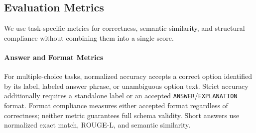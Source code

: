 \documentclass[a4paper,fleqn]{cas-sc}
\begin{document}



\subsection{Evaluation Metrics}

We use task-specific metrics for correctness, semantic similarity, and structural compliance without combining them into a single score.

\paragraph{Answer and Format Metrics}
For multiple-choice tasks, normalized accuracy accepts a correct option identified by its label, labeled answer phrase, or unambiguous option text. Strict accuracy additionally requires a standalone label or an accepted \texttt{ANSWER}/\texttt{EXPLANATION} format. Format compliance measures either accepted format regardless of correctness; neither metric guarantees full schema validity. Short answers use normalized exact match, ROUGE-L, and semantic similarity.
\end{document}
